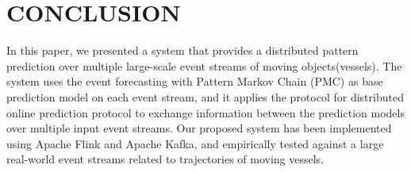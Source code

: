 
\section{CONCLUSION}
\label{sec:concl}
In this paper, we presented a system that provides  a distributed pattern prediction over multiple large-scale event streams of moving objects(vessels). The system uses the event forecasting with Pattern Markov Chain (PMC) \cite{alevizos2017event} as base prediction model on each event stream, and it applies the protocol for distributed online prediction \cite{kamp2014communication} protocol to exchange information between the prediction models over multiple input event streams.  Our proposed system has been implemented using Apache Flink and Apache Kafka, and empirically tested against a large real-world event streams related to trajectories of moving vessels.